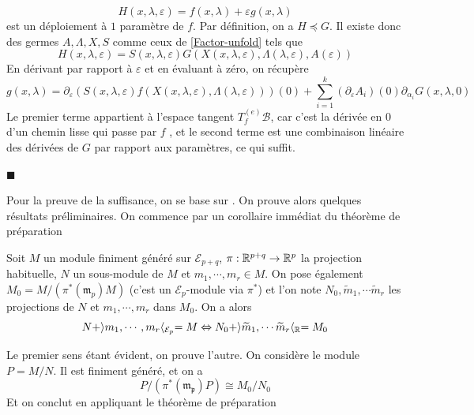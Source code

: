 \documentclass[memoire.tex]{subfiles}
\begin{document}
\begin{equation*}
    H(x,\lambda,\varepsilon)=f(x,\lambda)+
    \varepsilon g(x,\lambda)
\end{equation*}
est un déploiement à $1$ paramètre de $f$. Par définition, on a $H \preccurlyeq  G$. Il existe donc des germes $A,\Lambda,X,S$ comme ceux de \ref{Factor-unfold} tels que
\begin{equation*}
    H(x,\lambda,\varepsilon)=S(x,\lambda,\varepsilon)G(X(x,\lambda,\varepsilon),\Lambda(\lambda,\varepsilon),A(\varepsilon))
\end{equation*}
En dérivant par rapport à $\varepsilon$ et en évaluant à zéro, on récupère
\begin{equation*}
    g(x,\lambda)
    =\partial_\varepsilon (S(x,
    \lambda,\varepsilon)f(X(x,
    \lambda,\varepsilon),\Lambda(\lambda,
    \varepsilon)))(0)+\sum_{i=1}^
    {k} (\partial_\varepsilon A_i)
    (0)\partial_{\alpha_i}G(x,
    \lambda,0)
\end{equation*}
Le premier terme appartient à 
l'espace tangent $T^{(e)}_f\mathcal{B}$, 
car c'est la dérivée en $0$ d'un 
chemin lisse qui passe par $f$ , et le second terme est une combinaison linéaire des dérivées de $G$ par rapport aux paramètres, ce qui suffit.
{\unskip\nobreak\hfill\textcolor{color-prop}{$\blacksquare$}\par}
Pour la preuve de la 
suffisance, on se base sur 
\cite{golubitsky1979theory}. 
On prouve alors quelques 
résultats préliminaires. On 
commence par un corollaire 
immédiat du théorème de 
préparation
\begin{proposition}
    Soit $M$ un module finiment 
    généré sur 
    $\mathcal{E}_{p+q}$, $\pi: \mathbb{R}^{p+q}\rightarrow \mathbb{R}^p$ la projection habituelle, $N$ un sous-module de $M$ et $m_1,\cdots,m_r\in M$. On pose également $M_0=M/(\pi^{*}(\mathfrak{m}_p)M)$ (c'est un $\mathcal{E}_p$-module via $\pi^{*}$) et l'on note $N_0,\tilde{m}_{1},\cdots \tilde{m}_{r}$ les projections de $N$ et $m_1,\cdots,m_r$ dans $M_0$. On a alors
    \begin{equation*}
        N+\rangle m_1,\cdots,m_r\langle_{\mathcal{E}_p}=M \Leftrightarrow N_0+\rangle 
        \widetilde{m}_{1},\cdots \widetilde{m}_{r}
        \langle_{\mathbb{R}}=M_0
    \end{equation*}
\end{proposition}
\begin{preuve}
    Le premier sens étant évident, on prouve l'autre. On considère le module $P=M/N$. Il est finiment généré, et on a
    \begin{equation*}
        P/(\pi^{*}(\mathfrak{m_p})P)\cong M_0/N_0
    \end{equation*}
    Et on conclut en appliquant le théorème de préparation
\end{preuve}
\end{document}
